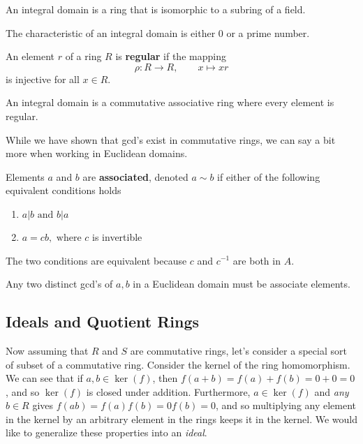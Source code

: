   \begin{theorem}
    An integral domain is a ring that is isomorphic to a subring of a field. 
  \end{theorem}

  \begin{theorem}
    The characteristic of an integral domain is either $0$ or a prime number. 
  \end{theorem}

  \begin{definition}
     An element $r$ of a ring $R$ is \textbf{regular} if the mapping 
     \begin{equation}
       \rho: R \longrightarrow R, \qquad x \mapsto x r
     \end{equation}
    is injective for all $x \in R$. 
  \end{definition}

  \begin{theorem}
    An integral domain is a commutative associative ring where every element is regular. 
  \end{theorem} 

  While we have shown that gcd's exist in commutative rings, we can say a bit more when working in Euclidean domains. 

  \begin{definition}
    Elements $a$ and $b$ are \textbf{associated}, denoted $a \sim b$ if either of the following equivalent conditions holds
    \begin{enumerate}
        \item $a | b \text{ and } b | a$
        \item $a = c b, \text{ where } c$ is invertible
    \end{enumerate}
    The two conditions are equivalent because $c$ and $c^{-1}$ are both in $A$. 
  \end{definition} 

  \begin{theorem}
    Any two distinct gcd's of $a, b$ in a Euclidean domain must be associate elements. 
  \end{theorem}

\subsection{Ideals and Quotient Rings} 

  Now assuming that $R$ and $S$ are commutative rings, let's consider a special sort of subset of a commutative ring. Consider the kernel of the ring homomorphism. We can see that if $a, b \in \ker(f)$, then $f(a + b) = f(a) + f(b) = 0 + 0 = 0$, and so $\ker(f)$ is closed under addition. Furthermore, $a \in \ker(f)$ and \textit{any} $b \in R$ gives $f(ab) = f(a) f(b) = 0 f(b) = 0$, and so multiplying any element in the kernel by an arbitrary element in the rings keeps it in the kernel. We would like to generalize these properties into an \textit{ideal}. 


